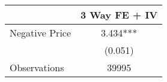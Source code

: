 \begin{tabular}{lc}
\hline
& 3 Way FE + IV \\
\hline
Negative Price & 3.434*** \\
 & (0.051) \\
\hline
Observations & 39995 \\
\hline
\end{tabular}